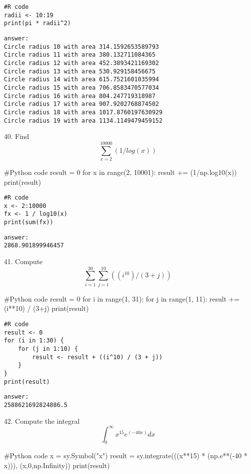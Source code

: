 \documentclass{article}
\begin{document}
\begin{verbatim}
#R code
radii <- 10:19
print(pi * radii^2)
\end{verbatim}

\begin{verbatim}
answer: 
Circle radius 10 with area 314.1592653589793
Circle radius 11 with area 380.132711084365
Circle radius 12 with area 452.3893421169302
Circle radius 13 with area 530.929158456675
Circle radius 14 with area 615.7521601035994
Circle radius 15 with area 706.8583470577034
Circle radius 16 with area 804.247719318987
Circle radius 17 with area 907.9202768874502
Circle radius 18 with area 1017.8760197630929
Circle radius 19 with area 1134.1149479459152
\end{verbatim}


40. Find \[ \sum_{x=2}^{10000} (1/log(x))\]
\begin{pythoncode}
#Python code
result = 0
for x in range(2, 10001):
    result += (1/np.log10(x))
print(result)
\end{pythoncode}

\begin{verbatim}
#R code
x <- 2:10000
fx <- 1 / log10(x)
print(sum(fx))
\end{verbatim}

\begin{verbatim}
answer: 
2868.901899946457
\end{verbatim}


41. Compute \[ \sum_{i=1}^{30} \sum_{j=1}^{10} ((i^{10})/(3+j))\]
\begin{pythoncode}
#Python code
result = 0
for i in range(1, 31):
    for j in range(1, 11):
        result += (i**10) / (3+j)
print(result)
\end{pythoncode}

\begin{verbatim}
#R code
result <- 0
for (i in 1:30) {
    for (j in 1:10) {
        result <- result + ((i^10) / (3 + j))
    }
}
print(result)
\end{verbatim}

\begin{verbatim}
answer: 
2588621692824886.5
\end{verbatim}


42. Compute the integral \[ \int_0^\infty x^{15}e^{(-40x)}dx\] 
\begin{pythoncode}
#Python code
x = sy.Symbol("x")
result = sy.integrate(((x**15) * (np.e**(-40 * x))), (x,0,np.Infinity))
print(result)
\end{pythoncode}
\end{document}

